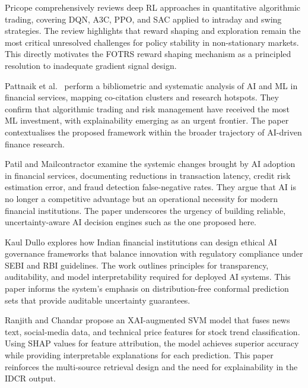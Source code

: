 \documentclass[12pt,a4paper,oneside]{report}
\theoremstyle{definition}
\theoremstyle{remark}
\begin{document}
\medskip

\noindent Pricope \cite{Pricope2021DRLAlgoTrading} comprehensively reviews deep RL approaches in quantitative algorithmic trading, covering DQN, A3C, PPO, and SAC applied to intraday and swing strategies. The review highlights that reward shaping and exploration remain the most critical unresolved challenges for policy stability in non-stationary markets. This directly motivates the FOTRS reward shaping mechanism as a principled resolution to inadequate gradient signal design.

\medskip

\noindent Pattnaik et al.\ \cite{Pattnaik2024AIBibliometric} perform a bibliometric and systematic analysis of AI and ML in financial services, mapping co-citation clusters and research hotspots. They confirm that algorithmic trading and risk management have received the most ML investment, with explainability emerging as an urgent frontier. The paper contextualises the proposed framework within the broader trajectory of AI-driven finance research.

\medskip

\noindent Patil and Mailcontractor \cite{Patil2024AIFinServices} examine the systemic changes brought by AI adoption in financial services, documenting reductions in transaction latency, credit risk estimation error, and fraud detection false-negative rates. They argue that AI is no longer a competitive advantage but an operational necessity for modern financial institutions. The paper underscores the urgency of building reliable, uncertainty-aware AI decision engines such as the one proposed here.

\medskip

\noindent Kaul Dullo \cite{KaulDullo2025EthicalAI} explores how Indian financial institutions can design ethical AI governance frameworks that balance innovation with regulatory compliance under SEBI and RBI guidelines. The work outlines principles for transparency, auditability, and model interpretability required for deployed AI systems. This paper informs the system's emphasis on distribution-free conformal prediction sets that provide auditable uncertainty guarantees.

\medskip

\noindent Ranjith and Chandar \cite{Ranjith2024XAISVM} propose an XAI-augmented SVM model that fuses news text, social-media data, and technical price features for stock trend classification. Using SHAP values for feature attribution, the model achieves superior accuracy while providing interpretable explanations for each prediction. This paper reinforces the multi-source retrieval design and the need for explainability in the IDCR output.
\end{document}

